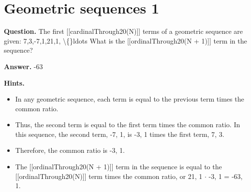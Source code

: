 \documentclass{article}
\begin{document}
\section*{Geometric sequences 1}
\textbf{Question.} The first [[cardinalThrough20(N)]] terms of a geometric sequence are given:
                7,3,-7,1,21,1, \textbackslash\{\}ldots
                What is the [[ordinalThrough20(N + 1)]] term in the sequence?

\textbf{Answer.} -63

\textbf{Hints.}
\begin{itemize}
  \item In any geometric sequence, each term is equal to the previous term times the common ratio.
  \item Thus, the second term is equal to the first term times the common ratio. In this sequence, the second term, -7, 1, is -3, 1 times the first term, 7, 3.
  \item Therefore, the common ratio is -3, 1.
  \item The [[ordinalThrough20(N + 1)]] term in the sequence is equal to the [[ordinalThrough20(N)]] term times the common ratio, or 21, 1 $\cdot$ -3, 1 = -63, 1.
\end{itemize}
\end{document}

